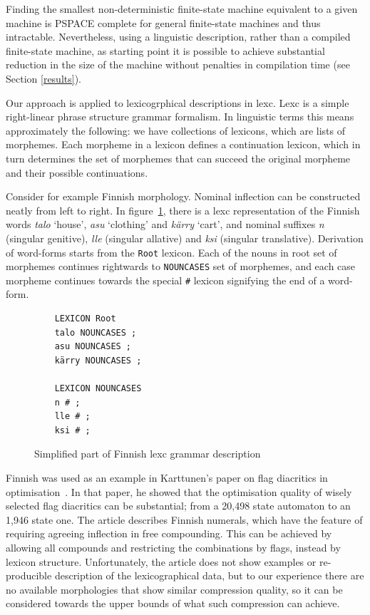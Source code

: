 \documentclass[11pt]{article}
\begin{document}
Finding the smallest non-deterministic finite-state machine equivalent
to a given machine is PSPACE complete \cite{jiang1993} for general
finite-state machines and thus intractable. Nevertheless, using a
linguistic description, rather than a compiled finite-state machine,
as starting point it is possible to achieve substantial reduction in
the size of the machine without penalties in compilation time (see
Section \ref{results}).

Our approach is applied to lexicogrphical descriptions in lexc. Lexc
is a simple right-linear phrase structure grammar formalism. In
linguistic terms this means approximately the following: we have
collections of lexicons, which are lists of morphemes. Each morpheme
in a lexicon defines a continuation lexicon, which in turn determines
the set of morphemes that can succeed the original morpheme and their
possible continuations.

Consider for example Finnish morphology. Nominal inflection can be
constructed neatly from left to right. In figure~\ref{fig:lexc-fin},
there is a lexc representation of the Finnish words \emph{talo} `house',
\emph{asu} `clothing' and \emph{kärry} `cart', and nominal suffixes
\emph{n} (singular genitive), \emph{lle} (singular allative) and
\emph{ksi} (singular translative). Derivation of word-forms starts
from the \texttt{Root} lexicon. Each of the nouns in root set of morphemes
continues rightwards to \texttt{NOUNCASES} set of morphemes, and each
case morpheme continues towards the special \texttt{\#} lexicon
signifying the end of a word-form.

\begin{figure}
    \centering
    \begin{verbatim}
    LEXICON Root
    talo NOUNCASES ;
    asu NOUNCASES ;
    kärry NOUNCASES ;

    LEXICON NOUNCASES
    n # ;
    lle # ;
    ksi # ;
    \end{verbatim}
    \caption{Simplified part of Finnish lexc grammar description
    \label{fig:lexc-fin}}
\end{figure}

Finnish was used as an example in Karttunen's paper on flag diacritics
in optimisation~. In that paper, he
showed that the optimisation quality of wisely selected flag
diacritics can be substantial; from a 20,498 state automaton to an
1,946 state one. The article describes Finnish numerals, which have
the feature of requiring agreeing inflection in free compounding. This
can be achieved by allowing all compounds and restricting the
combinations by flags, instead by lexicon structure. Unfortunately,
the article does not show examples or re-producible description of the
lexicographical data, but to our experience there are no available
morphologies that show similar compression quality, so it can be
considered towards the upper bounds of what such compression can
achieve.
\end{document}
